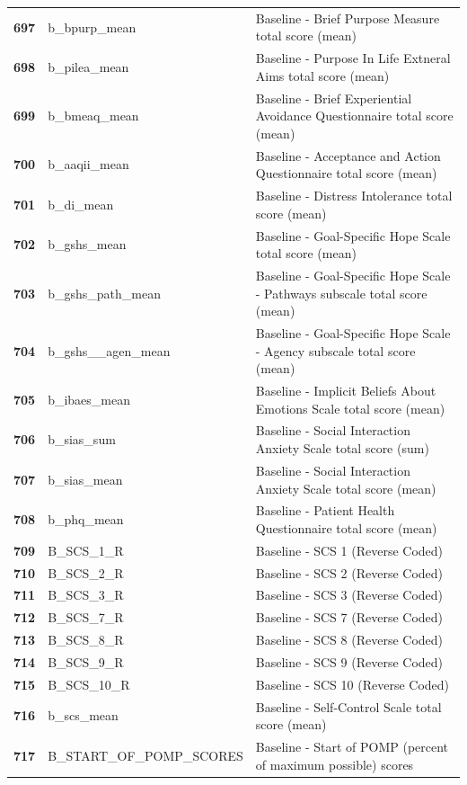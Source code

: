 \documentclass[
  letterpaper,
  DIV=11,
  numbers=noendperiod]{scrartcl}
\begin{document}
\begin{longtable}[t]{>{}cll}
\textbf{697} & b\_bpurp\_mean & Baseline - Brief Purpose Measure total score (mean)\\
\textbf{698} & b\_pilea\_mean & Baseline - Purpose In Life Extneral Aims total score (mean)\\
\textbf{699} & b\_bmeaq\_mean & Baseline - Brief Experiential Avoidance Questionnaire total score (mean)\\
\textbf{700} & b\_aaqii\_mean & Baseline - Acceptance and Action Questionnaire total score (mean)\\
\addlinespace
\textbf{701} & b\_di\_mean & Baseline - Distress Intolerance total score (mean)\\
\textbf{702} & b\_gshs\_mean & Baseline - Goal-Specific Hope Scale total score (mean)\\
\textbf{703} & b\_gshs\_path\_mean & Baseline - Goal-Specific Hope Scale - Pathways subscale total score (mean)\\
\textbf{704} & b\_gshs\_\_agen\_mean & Baseline - Goal-Specific Hope Scale - Agency subscale total score (mean)\\
\textbf{705} & b\_ibaes\_mean & Baseline - Implicit Beliefs About Emotions Scale total score (mean)\\
\addlinespace
\textbf{706} & b\_sias\_sum & Baseline - Social Interaction Anxiety Scale total score (sum)\\
\textbf{707} & b\_sias\_mean & Baseline - Social Interaction Anxiety Scale total score (mean)\\
\textbf{708} & b\_phq\_mean & Baseline - Patient Health Questionnaire total score (mean)\\
\textbf{709} & B\_SCS\_1\_R & Baseline - SCS 1 (Reverse Coded)\\
\textbf{710} & B\_SCS\_2\_R & Baseline - SCS 2 (Reverse Coded)\\
\addlinespace
\textbf{711} & B\_SCS\_3\_R & Baseline - SCS 3 (Reverse Coded)\\
\textbf{712} & B\_SCS\_7\_R & Baseline - SCS 7 (Reverse Coded)\\
\textbf{713} & B\_SCS\_8\_R & Baseline - SCS 8 (Reverse Coded)\\
\textbf{714} & B\_SCS\_9\_R & Baseline - SCS 9 (Reverse Coded)\\
\textbf{715} & B\_SCS\_10\_R & Baseline - SCS 10 (Reverse Coded)\\
\addlinespace
\textbf{716} & b\_scs\_mean & Baseline - Self-Control Scale total score (mean)\\
\textbf{717} & B\_START\_OF\_POMP\_SCORES & Baseline - Start of POMP (percent of maximum possible) scores\\

\end{longtable}
\end{document}
